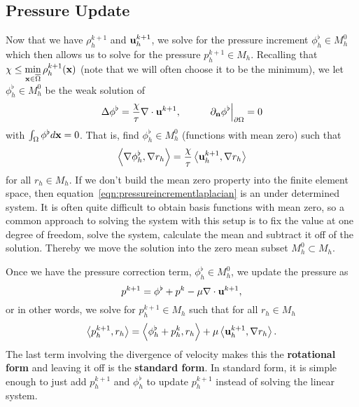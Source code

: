 \documentclass[letterpaper]{erdc}
\begin{document}
%
\subsection{Pressure Update}
Now that we have $\rho_h^{k+1}$ and $\textbf{u}_h^{k+1}$, we solve for the pressure increment $\phi_h^{\flat}\in M_h^0$ which then allows us to solve for the pressure $p_h^{k+1}\in M_h$.  
Recalling that $\chi \leq \displaystyle\min_{\textbf{x}\in\overline{\Omega}} \rho_h^{k+1}(\textbf{x})$ (note that we will often choose it to be the minimum), we let $\phi_h^{\flat}\in M^0_h$ be the weak solution of
\begin{equation}\label{eqn:pressureincrementlaplacian}
  \Delta \phi^{\flat} = \frac{\chi}{\tau}\nabla\cdot \textbf{u}^{k+1}, \hspace{1cm} \left.\partial_{\textbf{n}}\phi^{\flat}\right|_{\partial\Omega} = 0
\end{equation}
with $\int_{\Omega} \phi^{\flat} d\textbf{x} = 0$.  That is, find $\phi_h^{\flat}\in M_h^0$ (functions with mean zero) such that
\begin{equation}
  \left\langle \nabla\phi_h^{\flat}, \nabla r_h \right\rangle = \frac{\chi}{\tau}\left\langle \textbf{u}_h^{k+1}, \nabla r_h \right\rangle
\end{equation}
for all $r_h \in M_h$.  If we don't build the mean zero property into the finite element space, then equation~\ref{eqn:pressureincrementlaplacian} is an under determined system.  It is often quite difficult to obtain basis functions with mean zero, so a common approach to solving the system with this setup is to fix the value at one degree of freedom, solve the system, calculate the mean and subtract it off of the solution.  Thereby we move the solution into the zero mean subset $M_h^0\subset M_h$. 

 Once we have the pressure correction term, $\phi^{\flat}_h\in M_h^0$, we update the pressure as
\begin{equation}\label{eqn:rotationalpressureupdate}
  p^{k+1} = \phi^{\flat} + p^{k} - \mu\nabla\cdot \textbf{u}^{k+1},
\end{equation}
or in other words, we solve for $p_h^{k+1}\in M_h$ such that for all $r_h\in M_h$
\begin{equation}
  \left\langle p_h^{k+1}, r_h \right\rangle = \left\langle \phi_h^{\flat} + p_h^{k}, r_h \right\rangle + \mu\left\langle \textbf{u}_h^{k+1}, \nabla r_h \right\rangle.
\end{equation}
The last term involving the divergence of velocity makes this the \textbf{rotational form} and leaving it off is the \textbf{standard form}.  In standard form, it is simple enough to just add $p_h^{k+1}$ and $\phi_h^{\flat}$ to update $p_h^{k+1}$ instead of solving the linear system.
\end{document}
